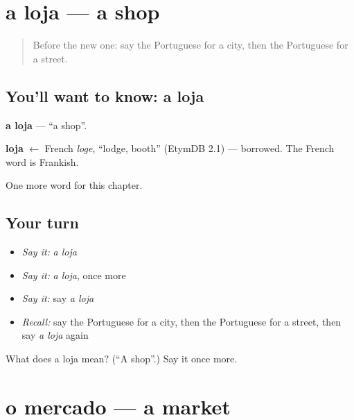 \section[a loja]{a loja — a shop}

\label{lesson:PT-C73-loja}



\begin{quote}
Before the new one: say the Portuguese for a city, then the Portuguese for a street.
\end{quote}

\subsection*{You'll want to know: a loja}
\textbf{a loja} — \textquotedblleft{}a shop\textquotedblright{}.

\begin{cousinweb}
\textbf{loja} $\leftarrow$ French \emph{loge}, \textquotedblleft{}lodge, booth\textquotedblright{} (EtymDB 2.1) — borrowed. The French word is Frankish.
\end{cousinweb}

\begin{grammarlens}[title={What you've built}]
One more word for this chapter.
\end{grammarlens}

\subsection*{Your turn}
\begin{itemize}
\raggedright
  \item \emph{Say it:} \emph{a loja}
  \item \emph{Say it:} \emph{a loja}, once more
  \item \emph{Say it:} say \emph{a loja}
  \item \emph{Recall:} say the Portuguese for a city, then the Portuguese for a street, then say \emph{a loja} again
\end{itemize}

\begin{tcolorbox}[breakable,colback=teal!4,colframe=teal!35!black,title={Before you move on}]
What does a loja mean? (\textquotedblleft{}A shop\textquotedblright{}.) Say it once more.
\end{tcolorbox}
\section[o mercado]{o mercado — a market}

